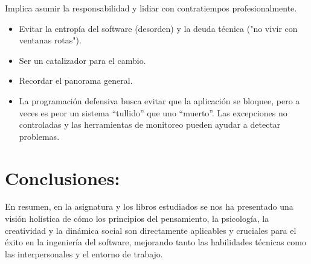 \documentclass[a4paper,12pt,twoside]{article}
\begin{document}
    Implica asumir la responsabilidad y lidiar con contratiempos profesionalmente.

\begin{itemize}

    \item Evitar la entropía del software (desorden) y la deuda técnica ("no vivir con ventanas rotas").
    \item Ser un catalizador para el cambio.
    \item Recordar el panorama general.
    \item La programación defensiva busca evitar que la aplicación se bloquee, pero a veces es peor un 
    sistema ``tullido'' que uno ``muerto''. 
    Las excepciones no controladas y las herramientas de monitoreo pueden ayudar a detectar problemas.

\end{itemize}


\section{Conclusiones:}
En resumen, en la asignatura y los libros estudiados se nos ha presentado una visión holística de cómo los principios del pensamiento, 
la psicología, la creatividad y la dinámica social son directamente aplicables y cruciales para el éxito en la ingeniería del software, 
mejorando tanto las habilidades técnicas como las interpersonales y el entorno de trabajo.
\end{document}
